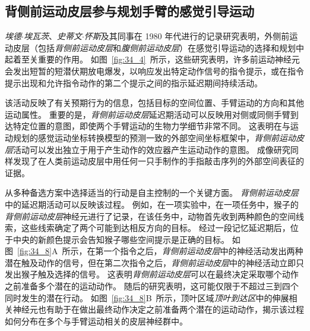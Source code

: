 \subsection{背侧前运动皮层参与规划手臂的感觉引导运动}

\textit{埃德$\cdot$埃瓦茨}、\textit{史蒂文$\cdot$怀斯}及其同事在 1980 年代进行的记录研究表明，外侧前运动皮层（包括\textit{背侧前运动皮层}和\textit{腹侧前运动皮层}）在感觉引导运动的选择和规划中起着至关重要的作用。
如图~\ref{fig:34_4}~所示，这些研究表明，许多前运动神经元会发出短暂的短潜伏期放电爆发，以响应发出特定动作信号的指令提示，或在指令提示出现和允许指令动作的第二个提示之间的指示延迟期间持续活动。


该活动反映了有关预期行为的信息，包括目标的空间位置、手臂运动的方向和其他运动属性。
重要的是，\textit{背侧前运动皮层}延迟期活动可以反映用对侧或同侧手臂到达特定位置的意图，即使两个手臂运动的生物力学细节非常不同。
这表明在与运动规划的感觉运动坐标转换模型的预测一致的外部空间坐标框架中，\textit{背侧前运动皮层}活动可以发出独立于用于产生动作的效应器产生运动动作的意图。
成像研究同样发现了在人类前运动皮层中用任何一只手制作的手指敲击序列的外部空间表征的证据。


从多种备选方案中选择适当的行动是自主控制的一个关键方面。
\textit{背侧前运动皮层}中的延迟期活动可以反映该过程。
例如，在一项实验中，在一项任务中，猴子的\textit{背侧前运动皮层}神经元进行了记录，在该任务中，动物首先收到两种颜色的空间线索，这些线索确定了两个可能到达相反方向的目标。 
经过一段记忆延迟期后，位于中央的新颜色提示会告知猴子哪些空间提示是正确的目标。
如图~\ref{fig:34_8}A~所示，在第一个指令之后，\textit{背侧前运动皮层}中的神经活动发出两种潜在触及动作的信号，但在第二次指令之后，\textit{背侧前运动皮层}中的神经活动立即只发出猴子触及选择的信号。
这表明\textit{背侧前运动皮层}可以在最终决定采取哪个动作之前准备多个潜在的运动动作。
随后的研究表明，这可能仅限于不超过三到四个同时发生的潜在行动。
如图~\ref{fig:34_8}B~所示，顶叶区域\textit{顶叶到达区}中的伸展相关神经元也有助于在做出最终动作决定之前准备两个潜在的运动动作，揭示该过程如何分布在多个与手臂运动相关的皮层神经群中。


